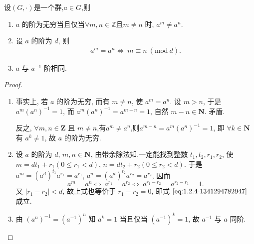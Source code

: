 \documentclass[../../main.tex]{subfiles}
\begin{document}
\begin{theorem}[群的阶的基本性质]
设$(G,\cdot)$是一个群,$a\in G$,则
\begin{enumerate}
\item \( a \) 的阶为无穷当且仅当$\forall m,n\in \mathbb{Z}$且\( m \neq n \) 时, \( a^m \neq a^n \).

\item  设 \( a \) 的阶为 \( d \), 则
\begin{align}
a^m = a^n \iff \ m \equiv n \ (\text{mod}\ d). \label{eq:1.2.4-1341294782947}
\end{align}

\item  \( a \) 与 \( a^{-1} \) 阶相同.
\end{enumerate}
\end{theorem}
\begin{proof}
\begin{enumerate}
\item 事实上, 若 \( a \) 的阶为无穷, 而有 \( m \neq n \), 使 \( a^m = a^n \). 设 \( m > n \), 于是 \( a^m(a^n)^{-1} = 1 \), 而 \( a^m(a^n)^{-1} = a^{m-n} = 1 \), 自然 \( m - n \in \mathbf{N} \). 矛盾.

反之, \( \forall m, n \in \mathbf{Z} \) 且 \( m \neq n \),有\( a^m \neq a^n \),则\( a^{m-n} = a^m(a^n)^{-1} = 1 \), 即 \( \forall k \in \mathbf{N} \) 有 \( a^k \neq 1 \), 故 \( a \) 的阶为无穷.

\item 设 \( a \) 的阶为 \( d \), \( m, n \in \mathbf{N} \), 由带余除法知,一定能找到整数 \( t_1, t_2, r_1, r_2 \), 使 \( m = dt_1 + r_1 (0 \leqslant r_1 < d) \), \( n = dt_2 + r_2 (0 \leqslant r_2 < d) \). 于是 \( a^m = (a^d)^{t_1} a^{r_1} = a^{r_1} \), \( a^n = (a^d)^{t_2} a^{r_2} = a^{r_2} \), 因而
\[
a^m = a^n \iff \ a^{r_1} = a^{r_2} \iff  \ a^{r_1 - r_2} = a^{r_2 - r_1} = 1.
\]
又 \( |r_1 - r_2| < d \), 故上式也等价于 \( r_1 - r_2 = 0 \), 即式 \(\eqref{eq:1.2.4-1341294782947}\) 成立.

\item 由 \( (a^n)^{-1} = (a^{-1})^n \) 知 \( a^k = 1 \) 当且仅当 \( (a^{-1})^k = 1 \), 故 \( a^{-1} \) 与 \( a \) 同阶.
\end{enumerate}
\end{proof}
\end{document}
